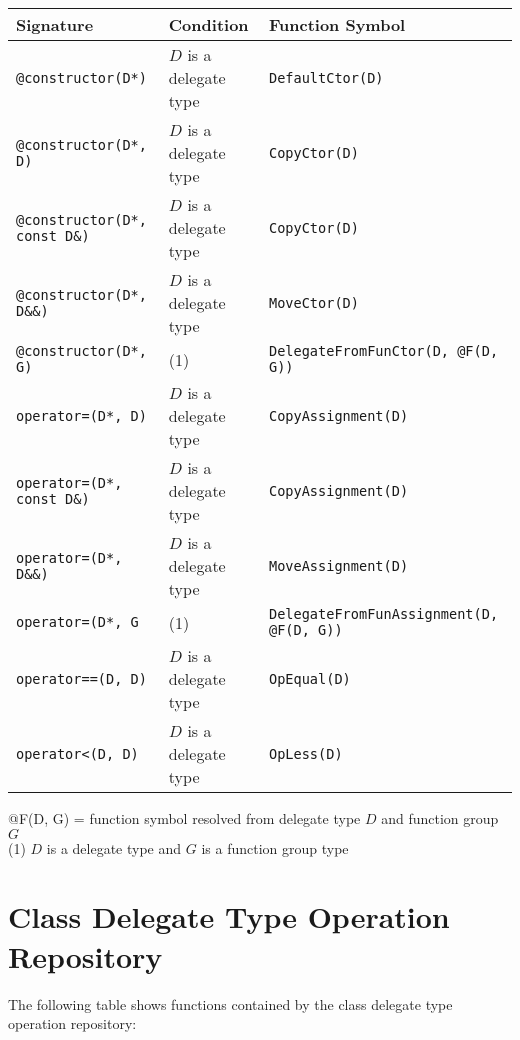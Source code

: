 \documentclass[a4paper,oneside,11pt]{book}
\theoremstyle{definition}
\begin{document}
\begin{flushleft}
\begin{supertabular}{lll}
\textbf{Signature}& \textbf{Condition}& \textbf{Function Symbol}\\
\hline
\verb|@constructor(D*)|& $D$ is a delegate type& \verb|DefaultCtor(D)|\\
\verb|@constructor(D*, D)|& $D$ is a delegate type& \verb|CopyCtor(D)|\\
\verb|@constructor(D*, const D&)|& $D$ is a delegate type& \verb|CopyCtor(D)|\\
\verb|@constructor(D*, D&&)|& $D$ is a delegate type& \verb|MoveCtor(D)|\\
\verb|@constructor(D*, G)|& (1)& \verb|DelegateFromFunCtor(D, @F(D, G))|\\
\verb|operator=(D*, D)|& $D$ is a delegate type& \verb|CopyAssignment(D)|\\
\verb|operator=(D*, const D&)|& $D$ is a delegate type& \verb|CopyAssignment(D)|\\
\verb|operator=(D*, D&&)|& $D$ is a delegate type& \verb|MoveAssignment(D)|\\
\verb|operator=(D*, G|& (1)& \verb|DelegateFromFunAssignment(D, @F(D, G))|\\
\verb|operator==(D, D)|& $D$ is a delegate type& \verb|OpEqual(D)|\\
\verb|operator<(D, D)|& $D$ is a delegate type& \verb|OpLess(D)|\\
\hline
\end{supertabular}
\end{flushleft}

\begin{flushleft}
@F(D, G) = function symbol resolved from delegate type $D$ and function group $G$\\
(1) $D$ is a delegate type and $G$ is a function group type
\end{flushleft}

\section{Class Delegate Type Operation Repository}

The following table shows functions contained by the class delegate type operation repository:
\end{document}
